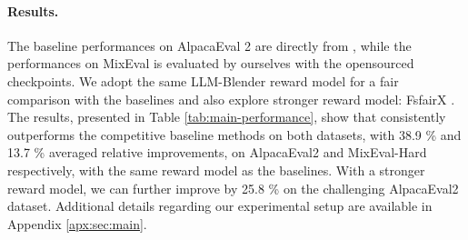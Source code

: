 \paragraph{Results.}
The baseline performances on AlpacaEval 2 are directly from \citet{meng2024simpo}, while the performances on MixEval is evaluated by ourselves with the opensourced checkpoints.
We adopt the same LLM-Blender \citep{jiang2023llm} reward model for a fair comparison with the baselines and also explore stronger reward model: FsfairX \citep{dong2024rlhf}.
The results, presented in Table \ref{tab:main-performance}, show that \Ours consistently outperforms the competitive baseline methods on both datasets, with 38.9 \% and 13.7 \% averaged relative improvements, on AlpacaEval2 and MixEval-Hard respectively, with the same reward model as the baselines.
With a stronger reward model, we can further improve \Ours by 25.8 \% on the challenging AlpacaEval2 dataset.
Additional details regarding our experimental setup are available in Appendix \ref{apx:sec:main}.




